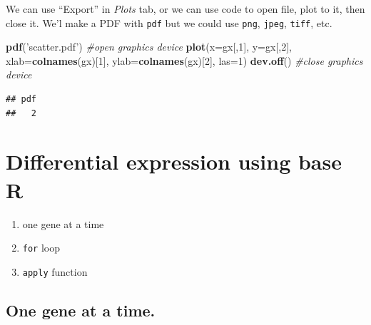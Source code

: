 \documentclass[]{article}
\newenvironment{Shaded}{\begin{snugshade}}{\end{snugshade}}
\newcommand{\KeywordTok}[1]{\textcolor[rgb]{0.13,0.29,0.53}{\textbf{#1}}}
\newcommand{\DataTypeTok}[1]{\textcolor[rgb]{0.13,0.29,0.53}{#1}}
\newcommand{\DecValTok}[1]{\textcolor[rgb]{0.00,0.00,0.81}{#1}}
\newcommand{\StringTok}[1]{\textcolor[rgb]{0.31,0.60,0.02}{#1}}
\newcommand{\CommentTok}[1]{\textcolor[rgb]{0.56,0.35,0.01}{\textit{#1}}}
\newcommand{\OperatorTok}[1]{\textcolor[rgb]{0.81,0.36,0.00}{\textbf{#1}}}
\newcommand{\NormalTok}[1]{#1}
\providecommand{\tightlist}{%
  \setlength{\itemsep}{0pt}\setlength{\parskip}{0pt}}
\begin{document}
We can use ``Export'' in \emph{Plots} tab, or we can use code to open
file, plot to it, then close it. We'l make a PDF with \texttt{pdf} but
we could use \texttt{png}, \texttt{jpeg}, \texttt{tiff}, etc.

\begin{Shaded}
\begin{Highlighting}[]
\KeywordTok{pdf}\NormalTok{(}\StringTok{'scatter.pdf'}\NormalTok{) }\CommentTok{#open graphics device}
\KeywordTok{plot}\NormalTok{(}\DataTypeTok{x=}\NormalTok{gx[,}\DecValTok{1}\NormalTok{], }\DataTypeTok{y=}\NormalTok{gx[,}\DecValTok{2}\NormalTok{], }\DataTypeTok{xlab=}\KeywordTok{colnames}\NormalTok{(gx)[}\DecValTok{1}\NormalTok{], }\DataTypeTok{ylab=}\KeywordTok{colnames}\NormalTok{(gx)[}\DecValTok{2}\NormalTok{], }\DataTypeTok{las=}\DecValTok{1}\NormalTok{)}
\KeywordTok{dev.off}\NormalTok{() }\CommentTok{#close graphics device}
\end{Highlighting}
\end{Shaded}

\begin{verbatim}
## pdf 
##   2
\end{verbatim}

\section{Differential expression using base
R}\label{differential-expression-using-base-r}

\begin{enumerate}
\def\labelenumi{\arabic{enumi}.}
\tightlist
\item
  one gene at a time
\item
  \texttt{for} loop
\item
  \texttt{apply} function
\end{enumerate}

\subsection{One gene at a time.}\label{one-gene-at-a-time.}

\begin{Shaded}
\end{Shaded}
\end{document}
